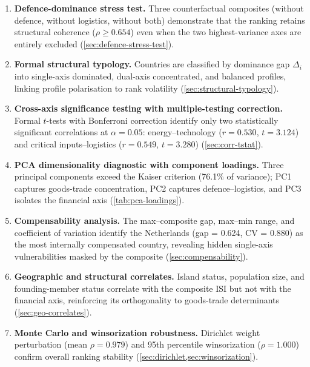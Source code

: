 \begin{enumerate}[leftmargin=2em]
  \item \textbf{Defence-dominance stress test.}
    Three counterfactual composites (without defence, without
    logistics, without both) demonstrate that the ranking retains
    structural coherence ($\rho \geq 0.654$) even when the two
    highest-variance axes are entirely excluded
    (\cref{sec:defence-stress-test}).

  \item \textbf{Formal structural typology.}
    Countries are classified by dominance gap $\Delta_i$ into
    single-axis dominated, dual-axis concentrated, and balanced
    profiles, linking profile polarisation to rank volatility
    (\cref{sec:structural-typology}).

  \item \textbf{Cross-axis significance testing with multiple-testing
    correction.}
    Formal $t$-tests with Bonferroni correction identify only two
    statistically significant correlations at $\alpha = 0.05$:
    energy--technology ($r = 0.530$, $t = 3.124$) and critical
    inputs--logistics ($r = 0.549$, $t = 3.280$)
    (\cref{sec:corr-tstat}).

  \item \textbf{PCA dimensionality diagnostic with component loadings.}
    Three principal components exceed the Kaiser criterion (76.1\%
    of variance); PC1 captures goods-trade concentration, PC2
    captures defence--logistics, and PC3 isolates the financial axis
    (\cref{tab:pca-loadings}).

  \item \textbf{Compensability analysis.}
    The max--composite gap, max--min range, and coefficient of
    variation identify the Netherlands (gap = 0.624, CV = 0.880)
    as the most internally compensated country, revealing hidden
    single-axis vulnerabilities masked by the composite
    (\cref{sec:compensability}).

  \item \textbf{Geographic and structural correlates.}
    Island status, population size, and founding-member status
    correlate with the composite ISI but not with the financial
    axis, reinforcing its orthogonality to goods-trade determinants
    (\cref{sec:geo-correlates}).

  \item \textbf{Monte Carlo and winsorization robustness.}
    Dirichlet weight perturbation (mean $\rho = 0.979$) and 95th
    percentile winsorization ($\rho = 1.000$) confirm overall ranking
    stability (\cref{sec:dirichlet,sec:winsorization}).


\end{enumerate}
